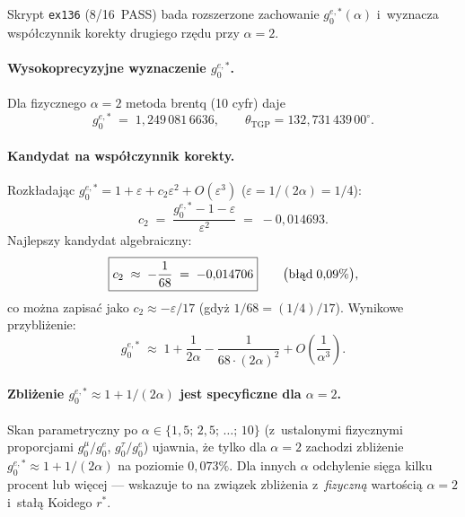 \begin{observation}\label{obs:T2-ex136}
  Skrypt \texttt{ex136} (8/16~PASS) bada rozszerzone zachowanie
  $g_0^{e,*}(\alpha)$ i~wyznacza wsp\'o\l{}czynnik korekty drugiego
  rz\k{e}du przy $\alpha=2$.

  \paragraph{Wysokoprecyzyjne wyznaczenie $g_0^{e,*}$.}
  Dla fizycznego $\alpha = 2$ metoda brentq (10 cyfr) daje
  \begin{equation}\label{eq:T2-g0estar-hprec}
    g_0^{e,*} \;=\; 1{,}249\,081\,6636,
    \qquad \theta_{\mathrm{TGP}}=132{,}731\,439\,00^\circ.
  \end{equation}

  \paragraph{Kandydat na wsp\'o\l{}czynnik korekty.}
  Rozk\l{}adaj\k{a}c $g_0^{e,*} = 1 + \varepsilon + c_2\varepsilon^2
  + O(\varepsilon^3)$ ($\varepsilon = 1/(2\alpha) = 1/4$):
  \begin{equation}\label{eq:T2-c2-value}
    c_2 \;=\;
    \frac{g_0^{e,*} - 1 - \varepsilon}{\varepsilon^2}
    \;=\; -0{,}014693.
  \end{equation}
  Najlepszy kandydat algebraiczny:
  \begin{equation}\label{eq:T2-c2-candidate}
    \boxed{c_2 \;\approx\; -\frac{1}{68} \;=\; -0{,}014706}
    \qquad\bigl(\text{b\l\k{a}d}\;0{,}09\%\bigr),
  \end{equation}
  co mo\.zna zapisa\'c jako $c_2 \approx -\varepsilon/17$ (gdy\.z
  $1/68 = (1/4)/17$).
  Wynikowe przybli\.zenie:
  \begin{equation}\label{eq:T2-g0e-expansion}
    g_0^{e,*} \;\approx\; 1 + \frac{1}{2\alpha}
               - \frac{1}{68\cdot(2\alpha)^2}
               + O\!\left(\frac{1}{\alpha^3}\right).
  \end{equation}

  \paragraph{Zbli\.zenie $g_0^{e,*} \approx 1+1/(2\alpha)$ jest specyficzne
    dla $\alpha = 2$.}
  Skan parametryczny po $\alpha \in \{1{,}5;\,2{,}5;\,\ldots;\,10\}$
  (z~ustalonymi fizycznymi proporcjami $g_0^\mu/g_0^e$, $g_0^\tau/g_0^e$)
  ujawnia, \.ze tylko dla $\alpha=2$ zachodzi zbli\.zenie $g_0^{e,*}
  \approx 1+1/(2\alpha)$ na poziomie $0{,}073\%$.  Dla innych $\alpha$
  odchylenie si\k{e}ga kilku procent lub wi\k{e}cej --- wskazuje to
  na zwi\k{a}zek zbli\.zenia z~\emph{fizyczn\k{a}} warto\'sci\k{a}
  $\alpha=2$ i~sta\l\k{a} Koidego $r^*$.


\end{observation}

